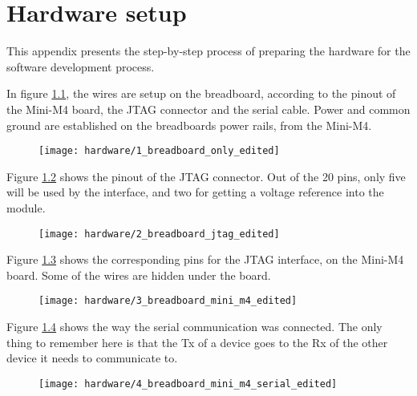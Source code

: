 \chapter{Hardware setup}\label{app:hardware_setup}

This appendix presents the step-by-step process of preparing the hardware
for the software development process.

In figure \ref{figAPP:hardware_setup_1},
the wires are setup on the breadboard, according to the
pinout of the Mini-M4 board, the JTAG connector and the serial cable.
Power and common ground are established on the breadboard\textquotesingle s
power rails, from the Mini-M4.

\begin{figure} [h]
\texttt{[image: hardware/1\_breadboard\_only\_edited]}
\label{figAPP:hardware_setup_1}
\end{figure}

Figure \ref{figAPP:hardware_setup_2}
shows the pinout of the JTAG connector. Out of the 20 pins, only
five will be used by the interface, and two for getting a voltage reference
into the module.
\begin{figure} [h]
\texttt{[image: hardware/2\_breadboard\_jtag\_edited]}
\label{figAPP:hardware_setup_2}
\end{figure}

Figure \ref{figAPP:hardware_setup_3}
shows the corresponding pins for the JTAG interface, on the Mini-M4
board. Some of the wires are hidden under the board.
\begin{figure} [H]
\texttt{[image: hardware/3\_breadboard\_mini\_m4\_edited]}
\label{figAPP:hardware_setup_3}
\end{figure}

Figure \ref{figAPP:hardware_setup_4}
shows the way the serial communication was connected. The only thing to
remember here is that the Tx of a device goes to the Rx of the
other device it needs to communicate to.
\begin{figure} [h]
\texttt{[image: hardware/4\_breadboard\_mini\_m4\_serial\_edited]}
\label{figAPP:hardware_setup_4}
\end{figure}
